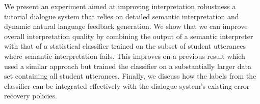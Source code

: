 We present an experiment aimed at improving interpretation robustness a tutorial dialogue system that relies on detailed semantic interpretation and
 dynamic natural language feedback generation. We show that we can improve
 overall interpretation quality by combining the output of a semantic
 interpreter with that of a statistical classifier trained on the subset of
 student utterances where semantic interpretation fails. This improves on a
 previous result which used a similar approach but trained the classifier on a
 substantially larger data set containing all student utterances.  Finally, we
 discuss how the labels from the classifier can be integrated effectively with
 the dialogue system's existing error recovery policies.

